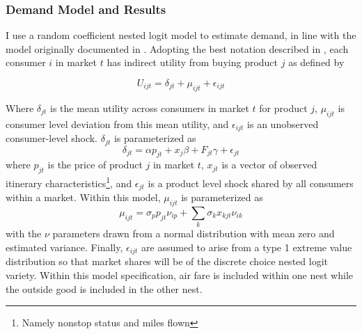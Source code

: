 \documentclass{article}
\begin{document}
 	 	 
	\subsubsection{Demand Model and Results}
	\label{sec:Analysis_Demand}
	I use a random coefficient nested logit model to estimate demand, in line with the model originally documented in \citet{berry_automobile_1995}. Adopting the best notation described in \citet{conlon_best_2020}, each consumer $i$ in market $t$ has indirect utility from buying product $j$ as defined by 
	
	\[U_{ijt} = \delta_{jt} + \mu_{ijt} + \epsilon_{ijt}\]
	
	Where $\delta_{jt}$ is the mean utility across consumers in market $t$ for product $j$, $\mu_{ijt}$ is consumer level deviation from this mean utility, and $\epsilon_{ijt}$ is an unobserved consumer-level shock. $\delta_{jt}$ is parameterized as \[\delta_{jt} = \alpha p_{jt} + x_{j} \beta + F_{jt}\gamma  +  \epsilon_{jt}\] where $p_{jt}$ is the price of product $j$ in market $t$, $x_{jt}$ is a vector of observed itinerary characteristics\footnote{Namely nonstop status and miles flown}, and $\epsilon_{jt}$ is a product level shock shared by all consumers within a market. Within this model, $\mu_{ijt}$ is parameterized as \[\mu_{ijt} = \sigma_{p} p_{jt} \nu_{ip} + \sum_{k} \sigma_{k} x_{kjt} \nu_{ik} \] with the $\nu$ parameters drawn from a  normal distribution with mean zero and estimated variance. Finally, $\epsilon_{ijt}$ are assumed to arise from a type 1 extreme value distribution so that market shares will be of the discrete choice nested logit variety. Within this model specification, air fare is included within one nest while the outside good is included in the other nest.
	
\end{document}
